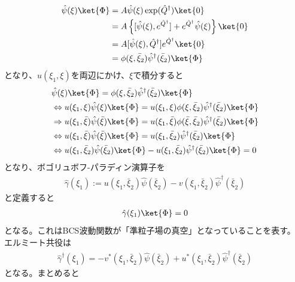 \documentclass[dvipdfmx, 11pt, a4paper]{jsarticle}
\numberwithin{equation}{section}
\theoremstyle{definition}
\begin{document}
    \begin{align}
        \hat{\psi}(\xi)\ket{\Phi} &=A\hat{\psi}(\xi)\exp(\hat{Q}^\dagger)\ket{0} \notag \\
        &= A\left\{ [\hat{\psi}(\xi),e^{\hat{Q}^\dagger}] + e^{\hat{Q}^\dagger} \hat{\psi}(\xi) \right\} \ket{0} \notag \\
        &= A[\hat{\psi}(\xi),\hat{Q}^\dagger]e^{\hat{Q}^\dagger} \ket{0} \notag \\
        &= \phi(\xi,\bar{\xi}_2)\hat{\psi}^\dagger(\bar{\xi}_2)\ket{\Phi}
    \end{align}
    となり、$u(\xi_1,\xi)$を両辺にかけ、$\xi$で積分すると
    \begin{align}
        &\hat{\psi}(\xi)\ket{\Phi}= \phi(\xi,\bar{\xi}_2)\hat{\psi}^\dagger(\bar{\xi}_2)\ket{\Phi} \notag \\
        &\Leftrightarrow u(\xi_1,\xi)\hat{\psi}(\xi)\ket{\Phi}= u(\xi_1,\xi)\phi(\xi,\bar{\xi}_2)\hat{\psi}^\dagger(\bar{\xi}_2)\ket{\Phi} \notag \\
        &\Rightarrow u(\xi_1,\bar{\xi})\hat{\psi}(\bar{\xi})\ket{\Phi}= u(\xi_1,\bar{\xi})\phi(\bar{\xi},\bar{\xi}_2)\hat{\psi}^\dagger(\bar{\xi}_2)\ket{\Phi} \notag \\
        &\Leftrightarrow u(\xi_1,\bar{\xi})\hat{\psi}(\bar{\xi})\ket{\Phi}= u(\xi_1,\bar{\xi}_2)\hat{\psi}^\dagger(\bar{\xi}_2)\ket{\Phi} \notag \\
        &\Leftrightarrow u(\xi_1,\bar{\xi}_2)\hat{\psi}(\bar{\xi}_2)\ket{\Phi}- u(\xi_1,\bar{\xi}_2)\hat{\psi}^\dagger(\bar{\xi}_2)\ket{\Phi}=0  \\
    \end{align}
    となり、ボゴリュボフ-パラディン演算子を
    \begin{align}
        \hat{\gamma}(\xi_1) := u(\xi_1,\bar{\xi}_2)\hat{\psi}(\bar{\xi}_2)-v(\xi_1,\bar{\xi}_2)\hat{\psi}^\dagger(\bar{\xi}_2)
    \end{align}
    と定義すると
    \begin{align}
        \hat{\gamma}(\xi_1)\ket{\Phi} = 0
    \end{align}
    となる。これはBCS波動関数が「準粒子場の真空」となっていることを表す。\\
    エルミート共役は
    \begin{align}
        \hat{\gamma}^\dagger(\xi_1) =-v^*(\xi_1,\bar{\xi}_2)\hat{\psi}(\bar{\xi}_2)+ u^*(\xi_1,\bar{\xi}_2)\hat{\psi}^\dagger(\bar{\xi}_2)
    \end{align}
    となる。まとめると
\end{document}

